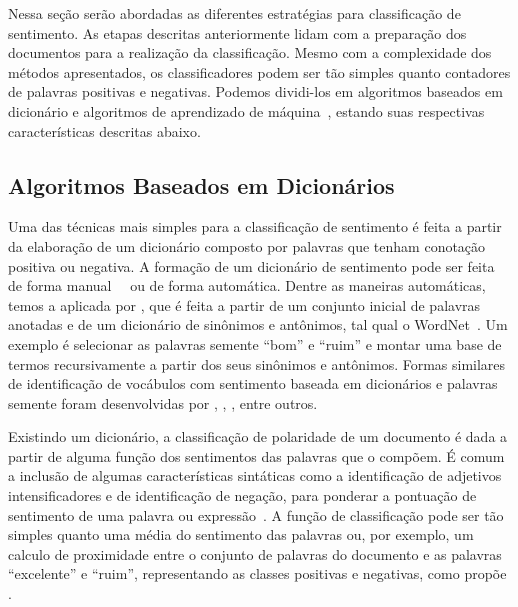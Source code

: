 Nessa seção serão abordadas as diferentes estratégias para classificação de
sentimento.
As etapas descritas anteriormente lidam com a preparação dos documentos para
a realização da classificação.
Mesmo com a complexidade dos métodos apresentados, os classificadores podem ser
tão simples quanto contadores de palavras positivas e negativas.
Podemos dividi-los em algoritmos baseados em dicionário e algoritmos de
aprendizado de máquina~\cite{taboada11}, estando suas respectivas
características descritas abaixo.

\subsection{Algoritmos Baseados em Dicionários} \label{sec:dictionary}

Uma das técnicas mais simples para a classificação de sentimento é feita a partir
da elaboração de um dicionário composto por palavras que tenham conotação
positiva ou negativa.
A formação de um dicionário de sentimento pode ser feita de forma
manual~\cite{stone66}~\cite{tong01} ou de forma automática.
Dentre as maneiras automáticas, temos a aplicada por \citet{hu04}, que é feita a
partir de um conjunto inicial de palavras anotadas e de um dicionário de
sinônimos e antônimos, tal qual o WordNet~\cite{miller90}.
Um exemplo é selecionar as palavras semente ``bom'' e ``ruim'' e montar uma base de
termos recursivamente a partir dos seus sinônimos e antônimos.
Formas similares de identificação de vocábulos com sentimento baseada em
dicionários e palavras semente foram desenvolvidas por \citet{blair08},
\citet{rao09}, \citet{hassan10}, entre outros.

Existindo um dicionário, a classificação de polaridade de um documento é dada
a partir de alguma função dos sentimentos das palavras que o compõem.
É comum a inclusão de algumas características sintáticas como a identificação de
adjetivos intensificadores e de identificação de negação, para ponderar a pontuação
de sentimento de uma palavra ou expressão~\cite{taboada11}.
A função de classificação pode ser tão simples quanto uma média do sentimento
das palavras ou, por exemplo, um calculo de proximidade entre o conjunto de
palavras do documento e as palavras ``excelente'' e ``ruim'', representando as
classes positivas e negativas, como propõe \citet{turney02}.


